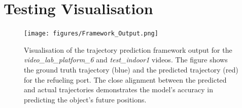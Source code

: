 \documentclass[12pt,oneside]{book} %
\begin{document}
\section{Testing Visualisation}

\begin{figure}[H]
    \centering
    \texttt{[image: figures/Framework\_Output.png]}
    \caption{Visualisation of the trajectory prediction framework output for the \textit{video\_lab\_platform\_6} and \textit{test\_indoor1} videos. The figure shows the ground truth trajectory (blue) and the predicted trajectory (red) for the refueling port. The close alignment between the predicted and actual trajectories demonstrates the model’s accuracy in predicting the object’s future positions.}
    \label{fig:trajectory-prediction-test-indoor1}
\end{figure}
\end{document}
